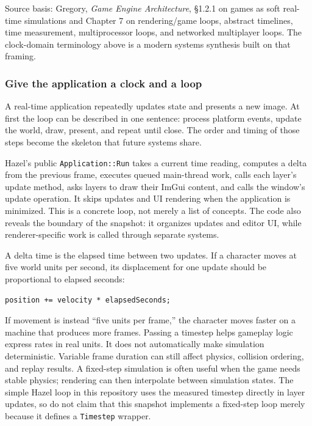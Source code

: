 Source basis: Gregory, \emph{Game Engine Architecture}, §1.2.1 on games as soft real-time simulations and Chapter 7 on rendering/game loops, abstract timelines, time measurement, multiprocessor loops, and networked multiplayer loops. The clock-domain terminology above is a modern systems synthesis built on that framing.

\subsubsection{Give the application a clock and a loop}\label{give-the-application-a-clock-and-a-loop}

A real-time application repeatedly updates state and presents a new image. At first the loop can be described in one sentence: process platform events, update the world, draw, present, and repeat until close. The order and timing of those steps become the skeleton that future systems share.

Hazel's public \texttt{Application::Run} takes a current time reading, computes a delta from the previous frame, executes queued main-thread work, calls each layer's update method, asks layers to draw their ImGui content, and calls the window's update operation. It skips updates and UI rendering when the application is minimized. This is a concrete loop, not merely a list of concepts. The code also reveals the boundary of the snapshot: it organizes updates and editor UI, while renderer-specific work is called through separate systems.

A delta time is the elapsed time between two updates. If a character moves at five world units per second, its displacement for one update should be proportional to elapsed seconds:

\begin{verbatim}
position += velocity * elapsedSeconds;
\end{verbatim}

If movement is instead ``five units per frame,'' the character moves faster on a machine that produces more frames. Passing a timestep helps gameplay logic express rates in real units. It does not automatically make simulation deterministic. Variable frame duration can still affect physics, collision ordering, and replay results. A fixed-step simulation is often useful when the game needs stable physics; rendering can then interpolate between simulation states. The simple Hazel loop in this repository uses the measured timestep directly in layer updates, so do not claim that this snapshot implements a fixed-step loop merely because it defines a \texttt{Timestep} wrapper.

